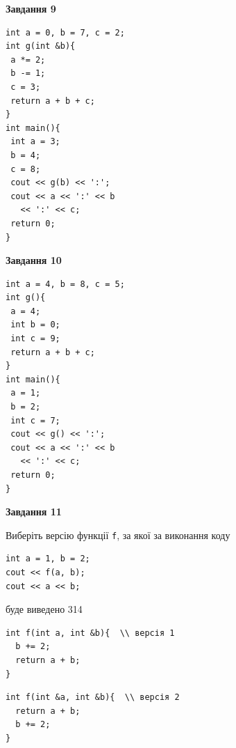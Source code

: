 \documentclass[12pt, ukrainian]{article}
\def\code#1{\Verb!#1!}
\begin{document}
{\begin {large}
\begin{minipage}[t]{11.0cm}
\end{minipage}


\begin{minipage}[t]{7.0cm}

\begin{center}
\textbf{Завдання 9}
\end{center}
\vspace{-8mm}

\begin{verbatim}
int a = 0, b = 7, c = 2;
int g(int &b){
 a *= 2;
 b -= 1;
 c = 3;
 return a + b + c;
}
int main(){
 int a = 3;
 b = 4;
 c = 8;
 cout << g(b) << ':';
 cout << a << ':' << b 
   << ':' << c;
 return 0;
}
\end{verbatim}



\begin{center}
\textbf{Завдання 10}
\end{center}
\vspace{-8mm}

\begin{verbatim}
int a = 4, b = 8, c = 5;
int g(){
 a = 4;
 int b = 0;
 int c = 9;
 return a + b + c;
}
int main(){
 a = 1;
 b = 2;
 int c = 7;
 cout << g() << ':';
 cout << a << ':' << b 
   << ':' << c;
 return 0;
}
\end{verbatim}

\end{minipage}
\vline \hspace{1mm}
\begin{minipage}[t]{11.0cm}

\begin{center}
\textbf{Завдання 11}
\end{center}
Виберіть версію функції \code{f}, за якої за виконання коду
\begin{verbatim}
int a = 1, b = 2;
cout << f(a, b);
cout << a << b;
\end{verbatim}

буде виведено 314

\begin{verbatim}
int f(int a, int &b){  \\ версія 1
  b += 2;
  return a + b;
}
\end{verbatim}

\vspace{-8mm}\begin{verbatim}
int f(int &a, int &b){  \\ версія 2
  return a + b;
  b += 2;
}
\end{verbatim}


\end{minipage}
\end{large}}
\end{document}
